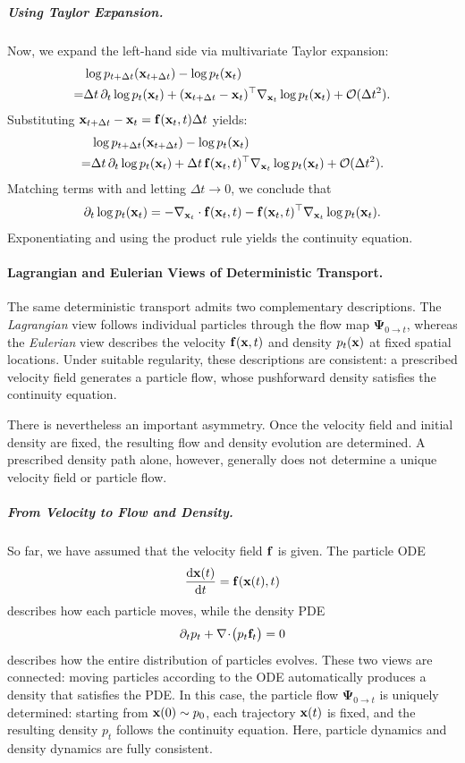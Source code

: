 \subparagraph{Using Taylor Expansion.}
Now, we expand the left-hand side via multivariate Taylor expansion:
\begin{align*}
    &\log p_{t+\Delta t}({\mathbf{x}}_{t+\Delta t}) 
    - \log p_t({\mathbf{x}}_t) 
    \\= &\Delta t\, \partial_t \log p_t({\mathbf{x}}_t) 
    + ({\mathbf{x}}_{t+\Delta t} - {\mathbf{x}}_t)^\top \nabla_{{\mathbf{x}}_t} \log p_t({\mathbf{x}}_t) 
    + \mathcal{O}(\Delta t^2).
\end{align*}
Substituting ${\mathbf{x}}_{t+\Delta t} - {\mathbf{x}}_t = {\mathbf{f}}({\mathbf{x}}_t, t)\Delta t$ yields:
\begin{align*}
    &\log p_{t+\Delta t}({\mathbf{x}}_{t+\Delta t}) 
    - \log p_t({\mathbf{x}}_t) 
    \\= & \Delta t\, \partial_t \log p_t({\mathbf{x}}_t) 
    + \Delta t\, {\mathbf{f}}({\mathbf{x}}_t, t)^\top \nabla_{{\mathbf{x}}_t} \log p_t({\mathbf{x}}_t) 
    + \mathcal{O}(\Delta t^2).
\end{align*}
Matching terms with  and letting $\Delta t \to 0$, we conclude that
\begin{equation*}
    \partial_t \log p_t({\mathbf{x}}_t) 
    = - \nabla_{{\mathbf{x}}_t} \cdot {\mathbf{f}}({\mathbf{x}}_t, t) 
    - {\mathbf{f}}({\mathbf{x}}_t, t)^\top \nabla_{{\mathbf{x}}_t} \log p_t({\mathbf{x}}_t).
\end{equation*}
Exponentiating and using the product rule yields the continuity equation.


\paragraph{Lagrangian and Eulerian Views of Deterministic Transport.}
The same deterministic transport admits two complementary descriptions.
The \emph{Lagrangian} view follows individual particles through the flow
map $\bm{\Psi}_{0\to t}$, whereas the \emph{Eulerian} view describes the
velocity ${\mathbf{f}}({\mathbf{x}},t)$ and density $p_t({\mathbf{x}})$ at fixed spatial
locations. Under suitable regularity, these descriptions are consistent:
a prescribed velocity field generates a particle flow, whose pushforward
density satisfies the continuity equation.

There is nevertheless an important asymmetry. Once the velocity field and
initial density are fixed, the resulting flow and density evolution are
determined. A prescribed density path alone, however, generally does not
determine a unique velocity field or particle flow.
 

\subparagraph{From Velocity to Flow and Density.}
So far, we have assumed that the velocity field ${\mathbf{f}}$ is given.  
The particle ODE
\[
\frac{\mathop{}\!\mathrm{d} {\mathbf{x}}(t)}{\mathop{}\!\mathrm{d} t} = {\mathbf{f}}({\mathbf{x}}(t), t)
\]
describes how each particle moves, while the density PDE
\[
\partial_t p_t + \nabla \!\cdot \!\big(p_t {\mathbf{f}}_t\big) = 0
\]
describes how the entire distribution of particles evolves.  
These two views are connected: moving particles according to the ODE automatically produces a density that satisfies the PDE.  
In this case, the particle flow $\bm{\Psi}_{0\to t}$ is uniquely determined: starting from ${\mathbf{x}}(0)\sim p_0$, each trajectory ${\mathbf{x}}(t)$ is fixed, and the resulting density $p_t$ follows the continuity equation.  
Here, particle dynamics and density dynamics are fully consistent.


